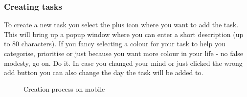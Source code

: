 \subsubsection{Creating tasks}
To create a new task you select the plus icon where you want to add the task. This will bring up a popup window where you can enter a short description (up to 80 characters). 
If you fancy selecting a colour for your task to help you categorise, prioritise or just because you want more colour in your life - no false modesty, go on. Do it. 
In case you changed your mind or just clicked the wrong add button you can also change the day the task will be added to. 

\begin{figure}%
    \centering
    \qquad
    \caption{Creation process on mobile}
    \label{fig:example}
\end{figure}
 
